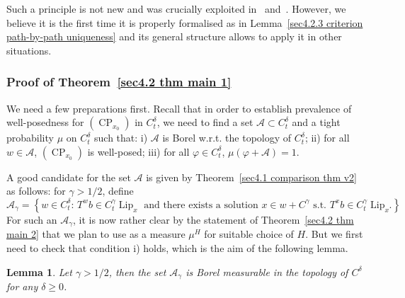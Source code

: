 \documentclass[10pt]{article}
\newcommand{\tmop}[1]{\ensuremath{\operatorname{#1}}}
\newtheorem{lemma}{Lemma}
\begin{document}
Such a principle is not new and was crucially exploited in~{\cite{davie}}
and~{\cite{catelliergubinelli}}. However, we believe it is the first time it
is properly formalised as in Lemma~\ref{sec4.2.3 criterion path-by-path
uniqueness} and its general structure allows to apply it in other situations.

\subsubsection{Proof of Theorem~\ref{sec4.2 thm main 1}}\label{sec4.2.1}

We need a few preparations first. Recall that in order to establish prevalence
of well-posedness for $(\tmop{CP}_{x_0})$ in $C_t^{\delta}$, we need to find a
set $\mathcal{A} \subset C_t^{\delta}$ and a tight probability $\mu$ on
$C_t^{\delta}$ such that: i) $\mathcal{A}$ is Borel w.r.t. the topology of
$C_t^{\delta}$; ii) for all $w \in \mathcal{A}$, $(\tmop{CP}_{x_0})$ is
well-posed; iii) for all $\varphi \in C_t^{\delta}$, $\mu (\varphi +
\mathcal{A}) = 1$.

A good candidate for the set $\mathcal{A}$ is given by Theorem~\ref{sec4.1
comparison thm v2} as follows: for $\gamma > 1 / 2$, define
\begin{equation}
  \mathcal{A}_{\gamma} = \left\{ w \in C^{\delta}_t : \, T^w b \in
  C^{\gamma}_t \tmop{Lip}_x \text{ and there exists a solution $x \in w +
  C^{\gamma}$ s.t. } T^x b \in C^{\gamma}_t \tmop{Lip}_x \right\} .
  \label{sec4.2.1 defn set}
\end{equation}
For such an $\mathcal{A}_{\gamma}$, it is now rather clear by the statement of
Theorem~\ref{sec4.2 thm main 2} that we plan to use as a measure $\mu^H$ for
suitable choice of $H$. But we first need to check that condition i) holds,
which is the aim of the following lemma.

\begin{lemma}
  \label{sec4.2.1 lemma borel set uniqueness}Let $\gamma > 1 / 2$, then the
  set $\mathcal{A}_{\gamma}$ is Borel measurable in the topology of
  $C^{\delta}$ for any $\delta \geqslant 0$.
\end{lemma}
\end{document}
